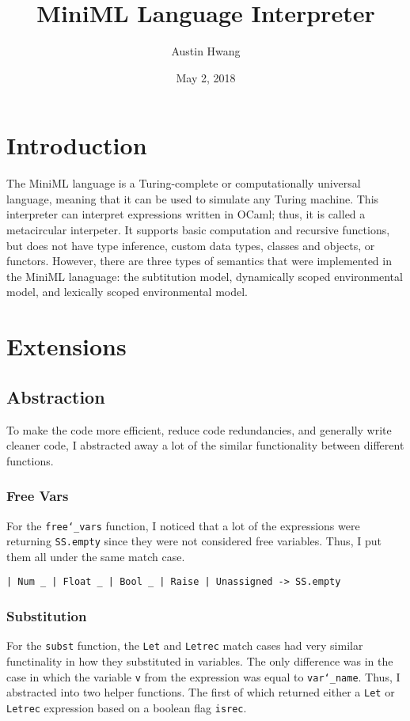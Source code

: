 \documentclass{article}
\title{MiniML Language Interpreter}
\author{Austin Hwang}
\date{May 2, 2018}
\begin{document}
\maketitle

\section{Introduction}
The MiniML language is a Turing-complete or computationally universal language, meaning that it can be used to simulate any Turing machine. This interpreter can interpret expressions written in OCaml; thus, it is called a metacircular interpeter. 
It supports basic computation and recursive functions, but does not have type inference, custom data types, classes and objects, or functors. However, there are three types of semantics that were implemented in the MiniML lanaguage: the subtitution model, dynamically scoped environmental model, and lexically scoped environmental model. 

\section{Extensions}

\subsection{Abstraction}

To make the code more efficient, reduce code redundancies, and generally write cleaner code, I abstracted away a lot of the similar functionality between different functions. 

\subsubsection{Free Vars}
For the \texttt{free\char`_vars} function, I noticed that a lot of the expressions were returning \texttt{SS.empty} since they were not considered free variables. Thus, I put them all under the same match case.


\begin{lstlisting}
| Num _ | Float _ | Bool _ | Raise | Unassigned -> SS.empty
\end{lstlisting}

\subsubsection{Substitution}
For the \texttt{subst} function, the \texttt{Let} and \texttt{Letrec} match cases had very similar functinality in how they substituted in variables. The only difference was in the case in which the variable \texttt{v} from the expression was equal to \texttt{var\char`_name}. 
Thus, I abstracted into two helper functions. The first of which returned either a \texttt{Let} or \texttt{Letrec} expression based on a boolean flag \texttt{isrec}.
\end{document}

